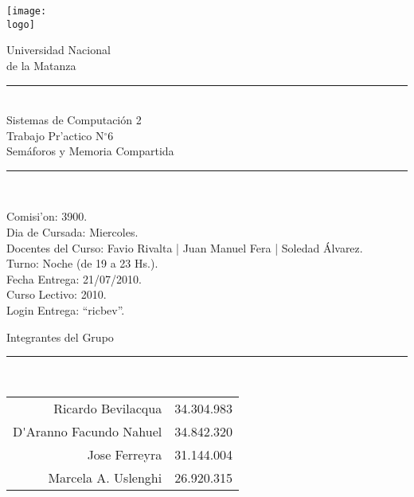 

\newcommand{\materia}{Sistemas de Computaci\'on 2}
\newcommand{\team}{Grupo N$^{\circ}$63}
\newcommand{\comision}{3900}
\newcommand{\diacursada}{Miercoles}
\newcommand{\turno}{Noche (de 19 a 23 Hs.)}
\newcommand{\anio}{2010}
\newcommand{\fecha}{21/07/2010}
\newcommand{\numtp}{6}
\newcommand{\nomtp}{Sem\'aforos y Memoria Compartida}
\newcommand{\docentes}{Favio Rivalta | Juan Manuel Fera | Soledad \'Alvarez}
\newcommand{\logo}{/home/ric/Documentos/Facultad/Varios/logoUnlam.png}

%
\thispagestyle{empty}

\begin{center}

 \texttt{[image: \\logo]}
 

\huge{Universidad Nacional\\de la Matanza}\\
\end{center}


\begin{center}
\rule{30mm}{.1pt}\\
\huge{\materia}\\
\huge{Trabajo Pr'actico N$^{\circ}$\numtp\\\nomtp}\\
\rule[5mm]{30mm}{.1pt}\\
\end{center}
Comisi'on: \comision.\\
Dia de Cursada: \diacursada.\\
Docentes del Curso: \docentes.\\
Turno: \turno.\\
Fecha Entrega: \fecha.\\
Curso Lectivo: \anio.\\
Login Entrega: ``ricbev''.



\begin{center}

\Large{Integrantes del Grupo}\\
\rule[2.5mm]{15mm}{.1pt}\\

\begin{tabular}{r|r}
Ricardo Bevilacqua & 34.304.983\\
D\'{ }Aranno Facundo Nahuel & 34.842.320\\
Jose Ferreyra & 31.144.004\\
Marcela A. Uslenghi & 26.920.315
\end{tabular}



\end{center}
\newpage


%

